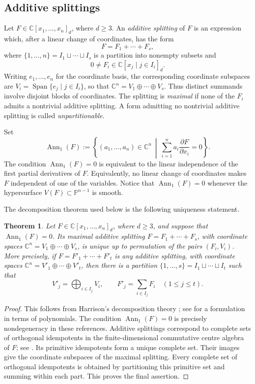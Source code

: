 \documentclass[12pt]{amsart}
\numberwithin{equation}{section}
\theoremstyle{plain}
\newtheorem{thm}{Theorem}[section]
\theoremstyle{definition}
\theoremstyle{remark}
\newcommand{\CC}{\mathbb C}
\newcommand{\PP}{\mathbb P}
\DeclareMathOperator{\Ann}{Ann}
\begin{document}
\subsection{Additive splittings}

Let $F\in \CC[x_1,\ldots,x_n]_d$, where $d\geq 3$.  An
\emph{additive splitting} of $F$ is an expression which, after a linear
change of coordinates, has the form
\begin{equation}\label{eq:additive-splitting}
    F=F_1+\cdots+F_s,
\end{equation}
where $\{1,\ldots,n\}=I_1\sqcup\cdots\sqcup I_s$
is a partition into nonempty subsets and
$$
    0\neq F_i\in \CC[x_j\mid j\in I_i]_d.
$$
Writing $e_1,\ldots,e_n$ for the coordinate basis, the corresponding coordinate subspaces are $V_i=\operatorname{Span}\{e_j\mid j\in I_i\}$, so that
$\CC^n=V_1\oplus\cdots\oplus V_s$. Thus distinct summands involve
disjoint blocks of coordinates. The splitting is
\emph{maximal} if none of the $F_i$ admits a nontrivial additive splitting.
A form admitting no nontrivial additive splitting is called
\emph{unpartitionable}.

Set
$$
    \Ann_1(F)
    :=
    \left\{
        (a_1,\ldots,a_n)\in\CC^n
        \ \middle|\
        \sum_{i=1}^n a_i\frac{\partial F}{\partial x_i}=0
    \right\}.
$$
The condition $\Ann_1(F)=0$ is equivalent to the linear independence of the
first partial derivatives of $F$.  Equivalently, no linear change of
coordinates makes $F$ independent of one of the variables.  Notice that
$\Ann_1(F)=0$ whenever the hypersurface $V(F)\subset\PP^{n-1}$ is smooth.

The decomposition theorem used below is the following uniqueness statement.

\begin{thm}\label{thm:unique-splitting}
Let $F\in\CC[x_1,\ldots,x_n]_d$, where $d\geq3$, and suppose that
$\Ann_1(F)=0$.  Its maximal additive splitting
$F=F_1+\cdots+F_s$, with coordinate spaces
$\CC^n=V_1\oplus\cdots\oplus V_s$, is unique up to permutation of the
pairs $(F_i,V_i)$. More precisely, if $F=F'_1+\cdots+F'_t$ is any additive splitting,
with coordinate spaces $\CC^n=V'_1\oplus\cdots\oplus V'_t$, then there is a
partition
$\{1,\ldots,s\}=I_1\sqcup\cdots\sqcup I_t$ such that
\[
V'_j=\bigoplus_{i\in I_j}V_i,\qquad
F'_j=\sum_{i\in I_j}F_i
\quad (1\leq j\leq t).
\]
\end{thm}

\begin{proof}
This follows from Harrison's decomposition theory
\cite{harrison1975higherdegreeforms}; see
\cite[Proposition~2.1(1)--(3)]{huang2022centres} for a formulation in terms
of polynomials.  The condition $\Ann_1(F)=0$ is precisely nondegeneracy in
these references. Additive splittings correspond to complete sets of
orthogonal idempotents in the finite-dimensional commutative centre algebra of $F$; see \cite[Equations~(3)--(5)]{huang2022centres}. Its primitive idempotents form a unique complete set.  Their images
give the coordinate subspaces of the maximal splitting.  Every complete set
of orthogonal idempotents is obtained by partitioning this primitive set and
summing within each part.  This proves the final assertion.
\end{proof}
\end{document}
